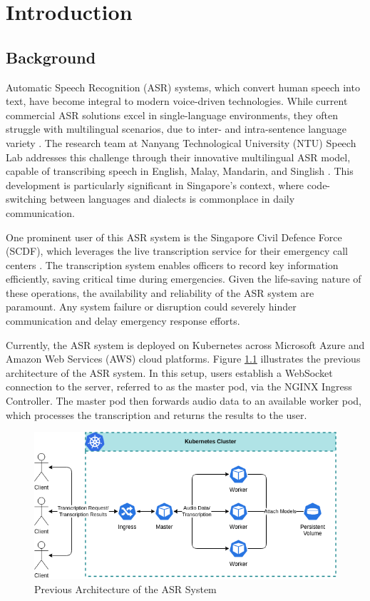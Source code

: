 \chapter{Introduction} \label{chapter:introduction}
\section{Background}

Automatic Speech Recognition (ASR) systems, which convert human speech into text, have become integral to modern voice-driven technologies. While current commercial ASR solutions excel in single-language environments, they often struggle with multilingual scenarios, due to inter- and intra-sentence language variety \cite{code_switching}. The research team at Nanyang Technological University (NTU) Speech Lab addresses this challenge through their innovative multilingual ASR model, capable of transcribing speech in English, Malay, Mandarin, and Singlish \cite{speech_lab,scdf_2}. This development is particularly significant in Singapore's context, where code-switching between languages and dialects is commonplace in daily communication.

One prominent user of this ASR system is the Singapore Civil Defence Force (SCDF), which leverages the live transcription service for their emergency call centers \cite{scdf}. The transcription system enables officers to record key information efficiently, saving critical time during emergencies. Given the life-saving nature of these operations, the availability and reliability of the ASR system are paramount. Any system failure or disruption could severely hinder communication and delay emergency response efforts.

Currently, the ASR system is deployed on Kubernetes across Microsoft Azure and Amazon Web Services (AWS) cloud platforms. Figure \ref{fig:previous_architecture} illustrates the previous architecture of the ASR system. In this setup, users establish a WebSocket connection to the server, referred to as the master pod, via the NGINX Ingress Controller. The master pod then forwards audio data to an available worker pod, which processes the transcription and returns the results to the user.

\begin{figure}[!ht]
    \centering
    \includegraphics[width=\textwidth]{figures/previous_architecture.drawio.png}
    \caption{Previous Architecture of the ASR System}
    \label{fig:previous_architecture}
\end{figure}

